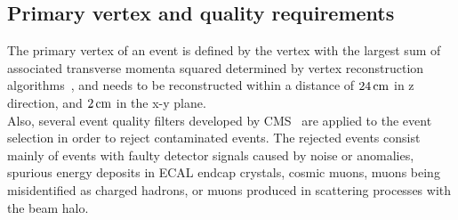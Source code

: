 
\subsection{Primary vertex and quality requirements}
The primary vertex of an event is defined by the vertex with the largest sum of associated transverse momenta squared determined by vertex reconstruction algorithms~\cite{vertex}, and needs to be reconstructed within a distance of $24\,\text{cm}$ in z direction, and $2\,\text{cm}$ in the x-y plane.\\
Also, several event quality filters developed by CMS~\cite{MetFilter} are applied to the event selection in order to reject contaminated events.
The rejected events consist mainly of events with faulty detector signals caused by noise or anomalies, spurious energy deposits in ECAL endcap crystals, cosmic muons, muons being misidentified as charged hadrons, or muons produced in scattering processes with the beam halo.


